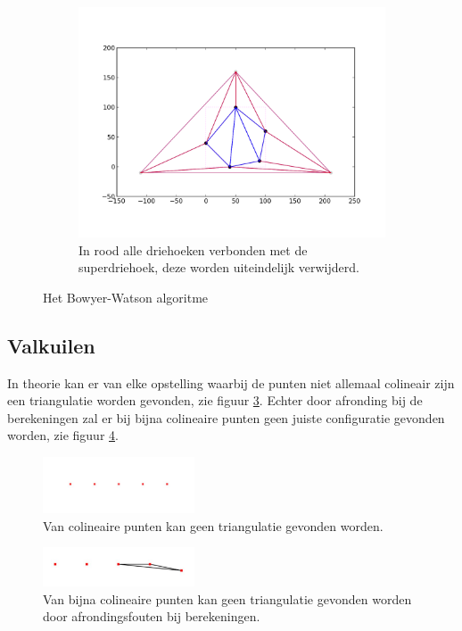 \begin{figure}[H]
\begin{subfigure}{0.4\textwidth}
		\includegraphics[width=\textwidth]{img/bowyer-watson_verwijderen}
		\caption{In rood alle driehoeken verbonden met de superdriehoek, deze worden uiteindelijk verwijderd.}
		\label{bowyer-watson-c}
	\end{subfigure}
	\caption{Het Bowyer-Watson algoritme \cite{Bowyer-WatsonWiki}}
	\label{bowyer-watson}
\end{figure}

\subsection{Valkuilen}
In theorie kan er van elke opstelling waarbij de punten niet allemaal colineair zijn een triangulatie worden gevonden, zie figuur \ref{colineair}. Echter door afronding bij de berekeningen zal er bij bijna colineaire punten geen juiste  configuratie gevonden worden, zie figuur \ref{almost_colineair}. 

\begin{figure}[H]
	\center
	\includegraphics[width=0.4\textwidth]{img/colineair}
	\caption{Van colineaire punten kan geen triangulatie gevonden worden.}
	\label{colineair}
\end{figure}
\begin{figure}[H]
	\center
	\includegraphics[width=0.4\textwidth]{img/almost_colinair}
	\caption{Van bijna colineaire punten kan geen triangulatie gevonden worden door afrondingsfouten bij berekeningen.}
	\label{almost_colineair}
\end{figure}

